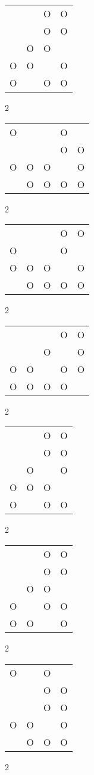 \begin{tabular}{|m{0.2cm}m{0.2cm}m{0.2cm}m{0.2cm}|}\hline
 & &O&O\\
 & &O&O\\
 &O&O& \\
O&O& &O\\
O& &O&O\\
\hline\end{tabular}2
\begin{tabular}{|m{0.2cm}m{0.2cm}m{0.2cm}m{0.2cm}m{0.2cm}|}\hline
O& & &O& \\
 & & &O&O\\
O&O&O& &O\\
 &O&O&O&O\\
\hline\end{tabular}2
\begin{tabular}{|m{0.2cm}m{0.2cm}m{0.2cm}m{0.2cm}m{0.2cm}|}\hline
 & & &O&O\\
O& & &O& \\
O&O&O& &O\\
 &O&O&O&O\\
\hline\end{tabular}2
\begin{tabular}{|m{0.2cm}m{0.2cm}m{0.2cm}m{0.2cm}m{0.2cm}|}\hline
 & & &O&O\\
 & &O& &O\\
O&O& &O&O\\
O&O&O&O& \\
\hline\end{tabular}2
\begin{tabular}{|m{0.2cm}m{0.2cm}m{0.2cm}m{0.2cm}|}\hline
 & &O&O\\
 & &O&O\\
 &O& &O\\
O&O&O& \\
O& &O&O\\
\hline\end{tabular}2
\begin{tabular}{|m{0.2cm}m{0.2cm}m{0.2cm}m{0.2cm}|}\hline
 & &O&O\\
 & &O&O\\
 &O&O& \\
O& &O&O\\
O&O& &O\\
\hline\end{tabular}2
\begin{tabular}{|m{0.2cm}m{0.2cm}m{0.2cm}m{0.2cm}|}\hline
O& &O& \\
 & &O&O\\
 & &O&O\\
O&O& &O\\
 &O&O&O\\
\hline\end{tabular}2
